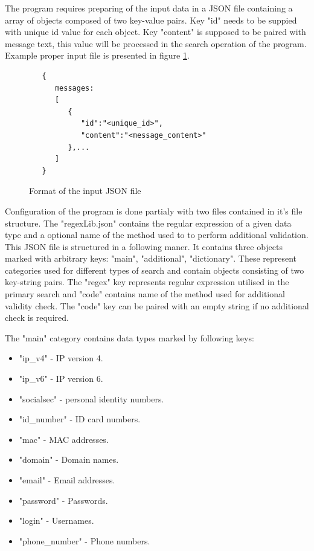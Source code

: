 \documentclass[a4paper,twoside,12pt]{book}
\begin{document}
The program requires preparing of the input data in a JSON file containing
a array of objects composed of two key-value pairs. Key "id" needs to be 
suppied with unique id value for each object. Key "content" is supposed to be 
paired with message text, this value will be processed in the search operation 
of the program. Example proper input file is presented in figure \ref{fig:inputFormat}.

\begin{figure}
   \centering
   \begin{lstlisting}
   {
      messages:
      [
         {
            "id":"<unique_id>",
            "content":"<message_content>"
         },...
      ]
   }
   \end{lstlisting}
   \caption{Format of the input JSON file}
   \label{fig:inputFormat}
\end{figure}

Configuration of the program is done partialy with two files contained in it's
file structure. The "regexLib.json" contains the regular expression of a given
data type and a optional name of the method used to to perform additional 
validation. This JSON file is structured in a following maner. It contains
three objects marked with arbitrary keys: "main", "additional", "dictionary".
These represent categories used for different types of search and contain
objects consisting of two key-string pairs. The "regex" key represents regular
expression utilised in the primary search and "code" contains name of the method 
used for additional validity check. The "code" key can be paired with an empty string
if no additional check is required.

The "main" category contains data types marked by following keys:

\begin{itemize}
   \item "ip\_v4" - IP version 4.
   \item "ip\_v6" - IP version 6.
   \item "socialsec" - personal identity numbers.
   \item "id\_number" - ID card numbers.
   \item "mac" - MAC addresses.
   \item "domain" - Domain names.
   \item "email" - Email addresses.
   \item "password" - Passwords.
   \item "login" - Usernames.
   \item "phone\_number" - Phone numbers.
\end{itemize} 
\end{document}
